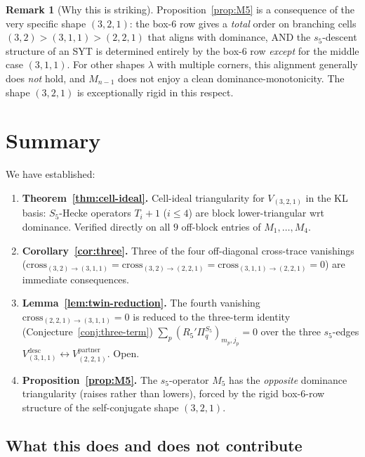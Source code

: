 \documentclass[11pt]{article}
\theoremstyle{definition}
\newtheorem{remark}[theorem]{Remark}
\begin{document}
\begin{remark}[Why this is striking]\label{rem:M5-special}
Proposition~\ref{prop:M5} is a consequence of the very specific shape $(3,2,1)$: the box-6 row gives a \emph{total} order on branching cells $(3,2) > (3,1,1) > (2,2,1)$ that aligns with dominance, AND the $s_5$-descent structure of an SYT is determined entirely by the box-6 row \emph{except} for the middle case $(3,1,1)$. For other shapes $\lambda$ with multiple corners, this alignment generally does \emph{not} hold, and $M_{n-1}$ does not enjoy a clean dominance-monotonicity. The shape $(3,2,1)$ is exceptionally rigid in this respect.
\end{remark}

\section{Summary}\label{sec:summary}

We have established:
\begin{enumerate}[leftmargin=2em,topsep=0.3em,itemsep=0.2em]
\item \textbf{Theorem~\ref{thm:cell-ideal}.} Cell-ideal triangularity for $V_{(3,2,1)}$ in the KL basis: $S_5$-Hecke operators $T_i+1$ ($i \leq 4$) are block lower-triangular wrt dominance. Verified directly on all $9$ off-block entries of $M_1, \ldots, M_4$.
\item \textbf{Corollary~\ref{cor:three}.} Three of the four off-diagonal cross-trace vanishings ($\mathrm{cross}_{(3,2)\to(3,1,1)} = \mathrm{cross}_{(3,2)\to(2,2,1)} = \mathrm{cross}_{(3,1,1)\to(2,2,1)} = 0$) are immediate consequences.
\item \textbf{Lemma~\ref{lem:twin-reduction}.} The fourth vanishing $\mathrm{cross}_{(2,2,1)\to(3,1,1)} = 0$ is reduced to the three-term identity (Conjecture~\ref{conj:three-term}) $\sum_p (R_5' \Pi_q^{S_5})_{m_p, j_p} = 0$ over the three $s_5$-edges $V_{(3,1,1)}^{\text{desc}} \leftrightarrow V_{(2,2,1)}^{\text{partner}}$. Open.
\item \textbf{Proposition~\ref{prop:M5}.} The $s_5$-operator $M_5$ has the \emph{opposite} dominance triangularity (raises rather than lowers), forced by the rigid box-6-row structure of the self-conjugate shape $(3,2,1)$.
\end{enumerate}

\subsection*{What this does and does not contribute}
\end{document}
